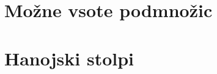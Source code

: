 \documentclass[10pt,a4paper,oneside]{book}
\begin{document}
\section{Možne vsote podmnožic}%


\section{Hanojski stolpi}

\end{document}
